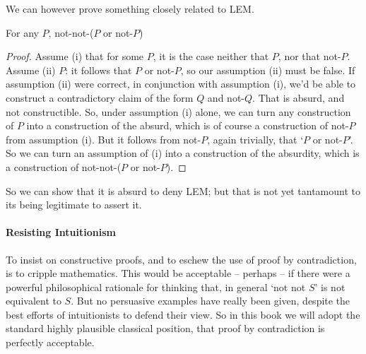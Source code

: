 We can however prove something closely related to LEM. \begin{theorem}
  For any $P$, not-not-($P$ or not-$P$)
 \begin{proof}
  Assume (i) that for some $P$, it is the case neither that $P$, nor that not-$P$. Assume (ii) $P$: it follows that $P$ or not-$P$, so our assumption (ii) must be false. If assumption (ii) were correct, in conjunction with assumption (i), we'd be able to construct a contradictory claim of the form $Q$ and not-$Q$. That is absurd, and not constructible. So, under assumption (i) alone, we can turn any construction of $P$ into a construction of the absurd, which is of course a construction of not-$P$ from assumption (i). But it follows from not-$P$, again trivially, that `$P$ or not-$P$'. So we can turn an assumption of (i) into a construction of the absurdity, which is a construction of not-not-($P$ or not-$P$).
\end{proof}
\end{theorem}
So we can show that it is absurd to deny LEM; but that is not yet tantamount to its being legitimate to assert it.


\paragraph{Resisting Intuitionism} To insist on constructive proofs, and to eschew the use of proof by contradiction, is to cripple mathematics. This would be acceptable – perhaps – if there were a powerful philosophical rationale for thinking that, in general `not not $S$' is not equivalent to $S$. But no persuasive examples have really been given, despite the best efforts of intuitionists to defend their view. So in this book we will adopt the standard highly plausible classical position, that proof by contradiction is perfectly acceptable.


